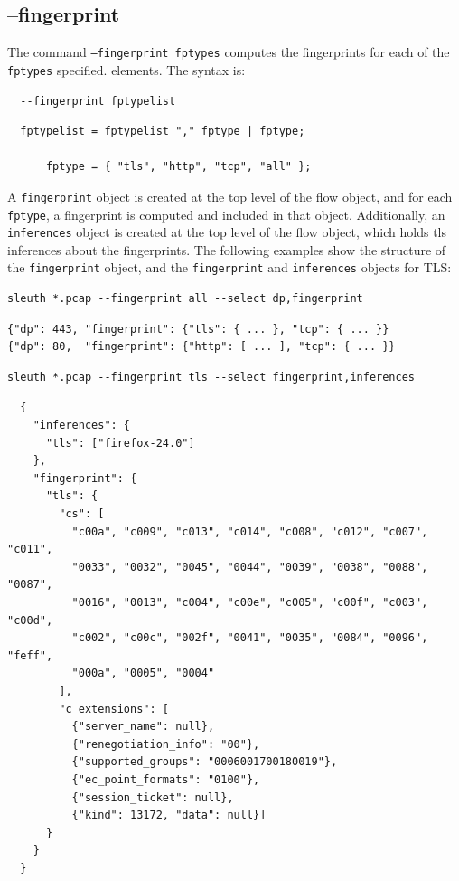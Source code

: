 \documentclass{book}
\begin{document}
\subsection{--fingerprint}
\label{fingerprint}
\label{sum}
The command \texttt{--fingerprint fptypes} computes the fingerprints
for each of the \texttt{fptypes} specified.  elements. The syntax is:
\begin{verbatim}
  --fingerprint fptypelist
\end{verbatim}
\begin{verbatim}
  fptypelist = fptypelist "," fptype | fptype;
  
      fptype = { "tls", "http", "tcp", "all" };
\end{verbatim}
A \texttt{fingerprint} object is created at the top level of the flow
object, and for each \texttt{fptype}, a fingerprint is computed and
included in that object.  Additionally, an \texttt{inferences} object
is created at the top level of the flow object, which holds tls
inferences about the fingerprints.  The following examples
show the structure of the \texttt{fingerprint} object,
and the \texttt{fingerprint} and \texttt{inferences}
objects for TLS:
\begin{mdframed}[style=cli]
  \begin{verbatim}
sleuth *.pcap --fingerprint all --select dp,fingerprint
  \end{verbatim}
\begin{verbatim}
{"dp": 443, "fingerprint": {"tls": { ... }, "tcp": { ... }}
{"dp": 80,  "fingerprint": {"http": [ ... ], "tcp": { ... }}
\end{verbatim}
\end{mdframed}

\begin{mdframed}[style=cli]
  \begin{verbatim}
sleuth *.pcap --fingerprint tls --select fingerprint,inferences
  \end{verbatim}
\begin{verbatim}
  {
    "inferences": {
      "tls": ["firefox-24.0"]
    },
    "fingerprint": {
      "tls": {
        "cs": [
          "c00a", "c009", "c013", "c014", "c008", "c012", "c007", "c011",
          "0033", "0032", "0045", "0044", "0039", "0038", "0088", "0087",
          "0016", "0013", "c004", "c00e", "c005", "c00f", "c003", "c00d",
          "c002", "c00c", "002f", "0041", "0035", "0084", "0096", "feff",
          "000a", "0005", "0004"
        ],
        "c_extensions": [
          {"server_name": null},
          {"renegotiation_info": "00"},
          {"supported_groups": "0006001700180019"},
          {"ec_point_formats": "0100"},
          {"session_ticket": null},
          {"kind": 13172, "data": null}]
      }
    }
  }
\end{verbatim}
\end{mdframed}
\end{document}
